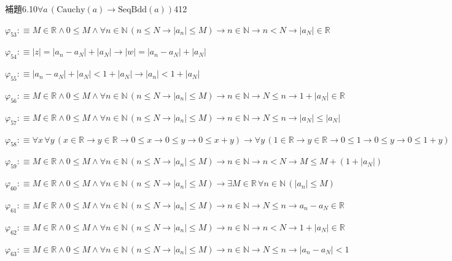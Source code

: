 \begin{fullproof}{補題6.10}{$\forall a\,(\mathrm{Cauchy}(a) \to \mathrm{SeqBdd}(a))$}{412}
\begin{abbrevlist}
\item $\varphi_{53} :\equiv M \in \mathbb{R} \land 0 \leq M \land \forall n \in \mathbb{N}\,(n \leq N \to \lvert a_{n} \rvert \leq M) \to n \in \mathbb{N} \to n < N \to \lvert a_{N} \rvert \in \mathbb{R}$
\item $\varphi_{54} :\equiv \lvert z \rvert = \lvert a_{n} - a_{N} \rvert + \lvert a_{N} \rvert \to \lvert w \rvert = \lvert a_{n} - a_{N} \rvert + \lvert a_{N} \rvert$
\item $\varphi_{55} :\equiv \lvert a_{n} - a_{N} \rvert + \lvert a_{N} \rvert < 1 + \lvert a_{N} \rvert \to \lvert a_{n} \rvert < 1 + \lvert a_{N} \rvert$
\item $\varphi_{56} :\equiv M \in \mathbb{R} \land 0 \leq M \land \forall n \in \mathbb{N}\,(n \leq N \to \lvert a_{n} \rvert \leq M) \to n \in \mathbb{N} \to N \leq n \to 1 + \lvert a_{N} \rvert \in \mathbb{R}$
\item $\varphi_{57} :\equiv M \in \mathbb{R} \land 0 \leq M \land \forall n \in \mathbb{N}\,(n \leq N \to \lvert a_{n} \rvert \leq M) \to n \in \mathbb{N} \to N \leq n \to \lvert a_{N} \rvert \leq \lvert a_{N} \rvert$
\item $\varphi_{58} :\equiv \forall x\,\forall y\,(x \in \mathbb{R} \to y \in \mathbb{R} \to 0 \leq x \to 0 \leq y \to 0 \leq x + y) \to \forall y\,(1 \in \mathbb{R} \to y \in \mathbb{R} \to 0 \leq 1 \to 0 \leq y \to 0 \leq 1 + y)$
\item $\varphi_{59} :\equiv M \in \mathbb{R} \land 0 \leq M \land \forall n \in \mathbb{N}\,(n \leq N \to \lvert a_{n} \rvert \leq M) \to n \in \mathbb{N} \to n < N \to M \leq M + (1 + \lvert a_{N} \rvert)$
\item $\varphi_{60} :\equiv M \in \mathbb{R} \land 0 \leq M \land \forall n \in \mathbb{N}\,(n \leq N \to \lvert a_{n} \rvert \leq M) \to \exists M \in \mathbb{R}\,\forall n \in \mathbb{N}\,(\lvert a_{n} \rvert \leq M)$
\item $\varphi_{61} :\equiv M \in \mathbb{R} \land 0 \leq M \land \forall n \in \mathbb{N}\,(n \leq N \to \lvert a_{n} \rvert \leq M) \to n \in \mathbb{N} \to N \leq n \to a_{n} - a_{N} \in \mathbb{R}$
\item $\varphi_{62} :\equiv M \in \mathbb{R} \land 0 \leq M \land \forall n \in \mathbb{N}\,(n \leq N \to \lvert a_{n} \rvert \leq M) \to n \in \mathbb{N} \to n < N \to 1 + \lvert a_{N} \rvert \in \mathbb{R}$
\item $\varphi_{63} :\equiv M \in \mathbb{R} \land 0 \leq M \land \forall n \in \mathbb{N}\,(n \leq N \to \lvert a_{n} \rvert \leq M) \to n \in \mathbb{N} \to N \leq n \to \lvert a_{n} - a_{N} \rvert < 1$

\end{abbrevlist}
\end{fullproof}
